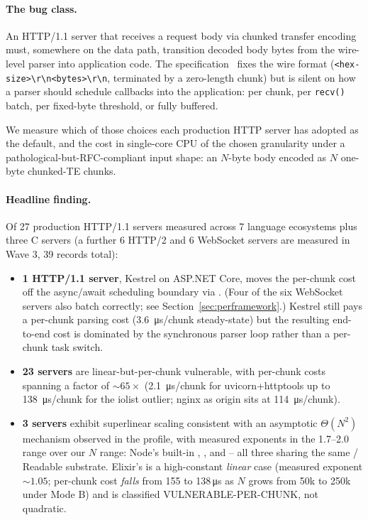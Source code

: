 \paragraph{The bug class.}
An HTTP/1.1 server that receives a request body via chunked
transfer encoding must, somewhere on the data path, transition
decoded body bytes from the wire-level parser into application
code. The specification~\cite{rfc9112} fixes the wire format
(\texttt{<hex-size>\textbackslash r\textbackslash n<bytes>\textbackslash r\textbackslash n},
terminated by a zero-length chunk) but is silent on how a parser
should schedule callbacks into the application: per chunk, per
\texttt{recv()} batch, per fixed-byte threshold, or fully buffered.

We measure which of those choices each production HTTP server has
adopted as the default, and the cost in single-core CPU of the
chosen granularity under a pathological-but-RFC-compliant input
shape: an $N$-byte body encoded as $N$ one-byte chunked-TE chunks.

\paragraph{Headline finding.}
Of 27 production HTTP/1.1 servers measured across 7 language
ecosystems plus three C servers (a further 6 HTTP/2 and 6
WebSocket servers are measured in Wave 3, 39 records total):

\begin{itemize}
\item \textbf{1 HTTP/1.1 server}, Kestrel on ASP.NET Core, moves
  the per-chunk cost off the async/await scheduling boundary via
  . (Four of the six WebSocket servers
  also batch correctly; see Section~\ref{sec:perframework}.)
  Kestrel still pays a per-chunk
  parsing cost (\SI{3.6}{\micro\second}/chunk steady-state) but
  the resulting end-to-end cost is dominated by the synchronous
  parser loop rather than a per-chunk task switch.
\item \textbf{23 servers} are linear-but-per-chunk vulnerable, with
  per-chunk costs spanning a factor of \(\sim 65\times\)
  (\SI{2.1}{\micro\second}/chunk for uvicorn+httptools up to
  \SI{138}{\micro\second}/chunk for the  iolist
  outlier; nginx as origin sits at \SI{114}{\micro\second}/chunk).
\item \textbf{3 servers} exhibit superlinear scaling consistent
  with an asymptotic \(\Theta(N^2)\) mechanism observed in the
  profile, with measured exponents in the 1.7--2.0 range over our
  $N$ range: Node's built-in , ,
  and  -- all three sharing the same
  / Readable substrate. Elixir's
   is a high-constant \emph{linear} case (measured
  exponent $\sim 1.05$; per-chunk cost \emph{falls} from 155 to
  138\,\si{\micro\second} as $N$ grows from 50k to 250k under
  Mode B) and is classified VULNERABLE-PER-CHUNK, not quadratic.
\end{itemize}

